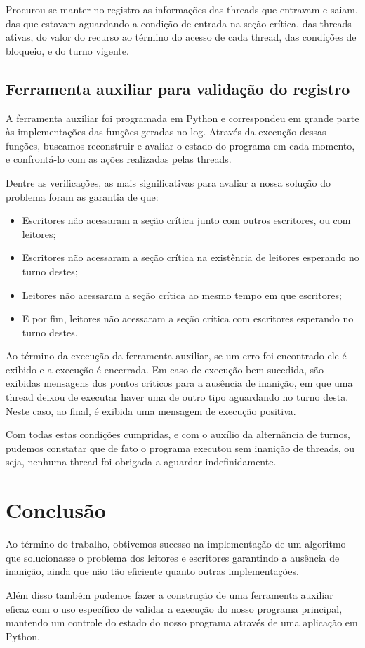 \documentclass[11pt]{article}
\begin{document}
Procurou-se manter no registro as informações das threads que entravam e saiam, das que
estavam aguardando a condição de entrada na seção crítica, das threads ativas, do
valor do recurso ao término do acesso de cada thread, das condições de bloqueio,
e do turno vigente.

\subsection{Ferramenta auxiliar para validação do registro}
\label{sec:orgf7a361c}
A ferramenta auxiliar foi programada em Python e correspondeu em grande parte às
implementações das funções geradas no log. Através da execução dessas funções,
buscamos reconstruir e avaliar o estado do programa em cada momento, e confrontá-lo
com as ações realizadas pelas threads.

Dentre as verificações, as mais significativas para avaliar a nossa solução do problema
foram as garantia de que:

\begin{itemize}
\item Escritores não acessaram a seção crítica junto com outros escritores, ou com leitores;
\item Escritores não acessaram a seção crítica na existência de leitores esperando no turno destes;
\item Leitores não acessaram a seção crítica ao mesmo tempo em que escritores;
\item E por fim, leitores não acessaram a seção crítica com escritores esperando no turno destes.
\end{itemize}

Ao término da execução da ferramenta auxiliar, se um erro foi encontrado ele é exibido e a
execução é encerrada. Em caso de execução bem sucedida, são exibidas mensagens dos pontos
críticos para a ausência de inanição, em que uma thread deixou de executar haver uma de
outro tipo aguardando no turno desta.
Neste caso, ao final, é exibida uma mensagem de execução positiva.

Com todas estas condições cumpridas, e com o auxílio da alternância de turnos, pudemos
constatar que de fato o programa executou sem inanição de threads, ou seja, nenhuma thread
foi obrigada a aguardar indefinidamente.

\section{Conclusão}
\label{sec:org1553848}
Ao término do trabalho, obtivemos sucesso na implementação de um algoritmo que solucionasse
o problema dos leitores e escritores garantindo a ausência de inanição, ainda que não tão
eficiente quanto outras implementações.

Além disso também pudemos fazer a construção de uma ferramenta auxiliar eficaz com o uso
específico de validar a execução do nosso programa principal, mantendo um controle do estado
do nosso programa através de uma aplicação em Python.
\end{document}
